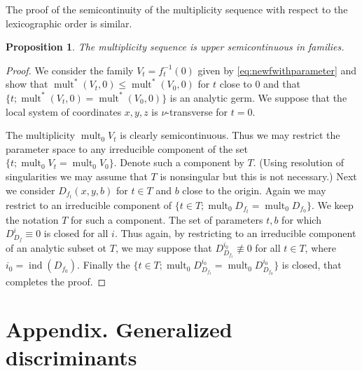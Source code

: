 \documentclass[11pt,a4paper]{amsart}
\newcommand{\1}{{1\!\!1}}
\numberwithin{equation}{section}
\theoremstyle{plain}%
\newtheorem{prop}[thm]{Proposition}
\theoremstyle{definition}
\theoremstyle{definition}
\theoremstyle{remark}
\newcommand{\C}{\mathbb{C}}
\renewcommand{\1}{\mathbf{1}}
\newcommand{\inv}{^{-1}}
\DeclareMathOperator{\snu}{mult}
\DeclareMathOperator{\idiscr}{ind}
\DeclareMathOperator{\mult}{mult}
\newcommand{\unt}{$\nu$-transverse }
\newcommand{\multseq}{multiplicity sequence }
\begin{document}
The proof of the semicontinuity  of the \multseq with respect to the lexicographic order is similar.  


\begin{prop}\label{prop:multsemicont}
The \multseq is upper semicontinuous in families.    
\end{prop}

\begin{proof}
We consider the family $V_t= f_t\inv (0)$ given by  \eqref{eq:newfwithparameter} and  show that $\snu^* (V_t, 0) \le \snu^* (V_0, 0)$ for $t$ close to $0$ and that 
$\{t;  \snu^* (V_t, 0) = \snu^* (V_0, 0)\}$ is an analytic germ.  
We suppose that the local system of coordinates $x,y,z$ is \unt for $t=0$.  

The multiplicity $\mult_0 V_t$ is clearly semicontinuous. Thus we may restrict the parameter space to any irreducible component of the set $\{t; \mult_0 V_t = \mult_0 V_0 \}$.  Denote such a component by $T$.  (Using resolution of singularities we may assume that $T$ is nonsingular but this is not necessary.)  Next we consider $D_{f_t}(x,y,b)$ for $t\in T$ and $b$ close to the origin.  Again we may restrict to an irreducible component of $\{t\in T; \mult_0 D_{f_t} = \mult_0 D_{f_0} \}$.  We keep the notation $T$ for such a component.   
The set of parameters $t,b$ for which $D^i_{D_f} \equiv 0$ is closed for all $i$.  Thus again, by restricting to an irreducible component of an analytic subset ot $T$, we may suppose that $D^{i_0}_{D_{f_t}} \not \equiv 0$ for all $t\in T$, where $i_0=\idiscr (D_{f_0}) $.  
Finally the $\{t\in T; \mult_0 D^{i_0}_{D_{f_t}} = \mult_0 D^{i_0}_{D_{f_0}} \}$ is closed, that completes the proof.  
\end{proof}






 \section*{Appendix. Generalized discriminants}%
\end{document}
